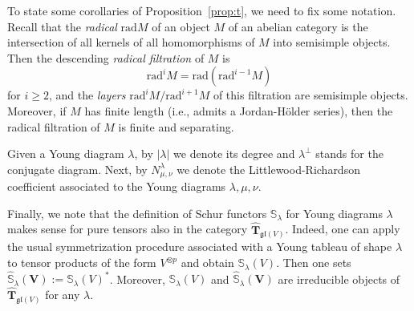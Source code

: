 \documentclass[12pt,reqno]{amsart}
\theoremstyle{definition}
\theoremstyle{remark}
\begin{document}
	
	
	
	
	To state some corollaries of Proposition~\ref{prop:t}, we need to fix some notation. Recall that the \textit{radical} $ \mathrm{rad}M $ of an object $ M $ of an abelian category is the intersection of all kernels of all homomorphisms of $ M $ into semisimple objects. Then the descending \textit{radical filtration} of $ M $ is
	$$
	\mathrm{rad}^{i}M = \mathrm{rad}(\mathrm{rad}^{i-1}M)
	$$
	for $ i\geqslant 2$, and the \textit{layers} $ \mathrm{rad}^{i}M/\mathrm{rad}^{i+1}M$ of this filtration are semisimple objects. Moreover, if $ M $ has finite length (i.e., admits a Jordan-H\"older series), then the radical filtration of $M$ is finite and separating.
	
	Given a Young diagram $ \lambda $, by $ |\lambda|  $ we denote its degree and $ \lambda^{\perp} $ stands for the conjugate diagram. Next, by $ N^{\lambda}_{\mu, \nu} $ we denote the Littlewood-Richardson coefficient associated to the Young diagrams $ \lambda, \mu, \nu $.
	
	Finally, we note that the definition of Schur functors $ \mathbb{S}_{\lambda} $ for Young diagrams $ \lambda $ makes sense for pure tensors also in the category $ \widehat{\mathbf{T}}_{\mathfrak{gl}(V)} $. Indeed, one can apply the usual symmetrization procedure associated with a Young tableau of shape $ \lambda $ to tensor products of the form $ V^{\otimes p}$ and obtain $ \mathbb{S}_{\lambda}(V) $. Then one sets $ \widehat{\mathbb{S}}_{\lambda}(\mathbf{V}):= \mathbb{S}_{\lambda}(V)^{*} $. Moreover, $ \mathbb{S}_{\lambda}(V) $ and $ \widehat{\mathbb{S}}_{\lambda}(\mathbf{V}) $ are irreducible objects of $ \widehat{\mathbf{T}}_{\mathfrak{gl}(V)} $ for any $ \lambda $.
	
\end{document}
